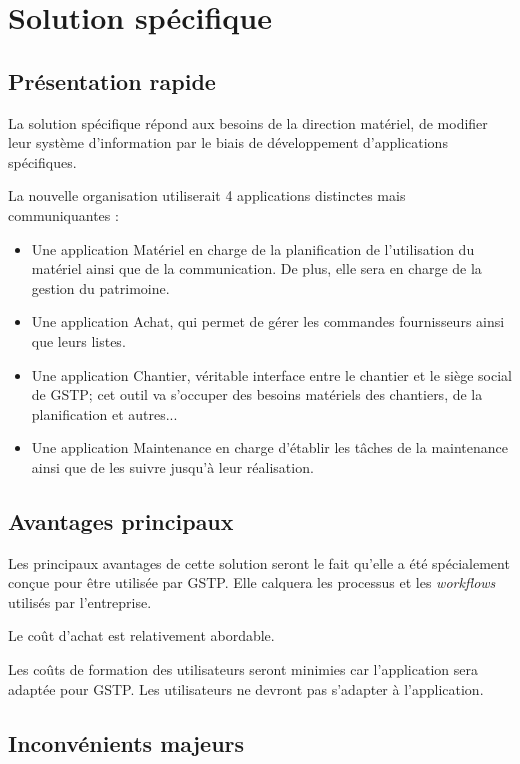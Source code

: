 \section{Solution spécifique}

\subsection{Présentation rapide}

La solution spécifique répond aux besoins de la direction matériel, de modifier
leur système d'information par le biais de développement d'applications spécifiques.

La nouvelle organisation utiliserait 4 applications distinctes mais communiquantes : 
\begin{itemize}
\item Une application Matériel en charge de la planification de l'utilisation du 
matériel ainsi que de la communication. De plus, elle sera en charge de la gestion du 
patrimoine.
\item Une application Achat, qui permet de gérer les commandes fournisseurs ainsi que
leurs listes.
\item Une application Chantier, véritable interface entre le chantier et le siège 
social de GSTP; cet outil va s'occuper des besoins matériels des chantiers, de la planification et autres...
\item Une application Maintenance en charge d'établir les tâches de la maintenance ainsi que de les suivre 
jusqu'à leur réalisation.
\end{itemize}

\subsection{Avantages principaux}

Les principaux avantages de cette solution seront le fait qu'elle a été spécialement
conçue pour être utilisée par GSTP. Elle calquera les processus et les {\sl workflows}
utilisés par l'entreprise.

Le coût d'achat est relativement abordable.

Les coûts de formation des utilisateurs seront minimies car l'application sera 
adaptée pour GSTP. Les utilisateurs ne devront pas s'adapter à l'application.

\subsection{Inconvénients majeurs}

